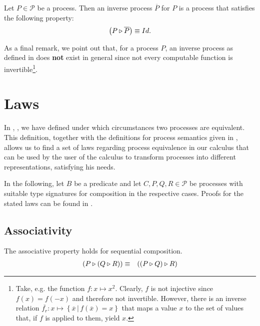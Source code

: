 \begin{definition}
\label{def:inverse_process}
Let $P \in \mathcal{P}$ be a process. Then an inverse process $\overline{P}$ for $P$ is a process that satisfies the following property:
  \begin{equation*}
    \left( P \triangleright \overline{P} \right) \equiv Id.
  \end{equation*}
  \hfill\qedsymbol
\end{definition}


As a final remark, we point out that, for a process $P$, an inverse process as defined in  does \textbf{not} exist in general since not every computable function is invertible\footnote{Take, e.g. the function $f \colon x \mapsto x^2$. Clearly, $f$ is not injective since $f \left( x \right) = f \left( -x \right)$ and therefore not invertible. However, there is an inverse relation $\overline{f_r} \colon x \mapsto \left\{ \overline{x} \,|\, f \left( \overline{x} \right) = x \right\}$ that maps a value $x$ to the set of values that, if $f$ is applied to them, yield $x$.}.



\clearpage
\section{Laws}
\label{chp:laws}
In , , we have defined under which circumstances two processes are equivalent. This definition, together with the definitions for process semantics given in , allows us to find a set of laws regarding process equivalence in our calculus that can be used by the user of the calculus to transform processes into different representations, satisfying his needs.

In the following, let $B$ be a predicate and let $C, P, Q, R \in \mathcal{P}$ be processes with suitable type signatures for composition in the respective cases. Proofs for the stated laws can be found in .

\subsection{Associativity}
The associative property holds for sequential composition.
\begin{eqnarray*}
  \left( P \triangleright \left( Q \triangleright R \right) \right) & \equiv & \left( \left( P \triangleright Q \right) \triangleright R \right)
\end{eqnarray*}

